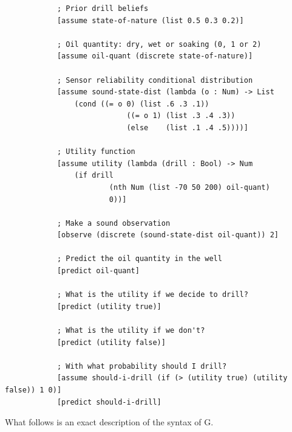\documentclass[a4paper]{article}
\begin{document}
\begin{center}
	\begin{varwidth}{\linewidth}
		\small
		\begin{verbatim}
			; Prior drill beliefs
			[assume state-of-nature (list 0.5 0.3 0.2)] 

			; Oil quantity: dry, wet or soaking (0, 1 or 2)
			[assume oil-quant (discrete state-of-nature)]

			; Sensor reliability conditional distribution
			[assume sound-state-dist (lambda (o : Num) -> List
				(cond ((= o 0) (list .6 .3 .1))
							((= o 1) (list .3 .4 .3))
							(else    (list .1 .4 .5))))]

			; Utility function 
			[assume utility (lambda (drill : Bool) -> Num 
				(if drill
						(nth Num (list -70 50 200) oil-quant)
						0))]

			; Make a sound observation
			[observe (discrete (sound-state-dist oil-quant)) 2]

			; Predict the oil quantity in the well
			[predict oil-quant]

			; What is the utility if we decide to drill?
			[predict (utility true)]

			; What is the utility if we don't?
			[predict (utility false)]

			; With what probability should I drill?
			[assume should-i-drill (if (> (utility true) (utility false)) 1 0)]
			[predict should-i-drill]
		\end{verbatim}
	\end{varwidth}
\end{center}
What follows is an exact description of the syntax of G.
\end{document}
